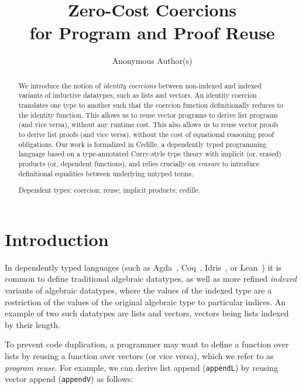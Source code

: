 \documentclass[a4paper,envcountsame,envcountsect]{llncs}
\newcommand{\keywords}[1]{\par\addvspace\baselineskip
\noindent\keywordname\enspace\ignorespaces#1}
\newcommand{\labsec}[1]{\label{sec:#1}}
\begin{document}

\mainmatter
\title{Zero-Cost Coercions \\for Program and Proof Reuse}
\author{Anonymous Author(s)}
\maketitle

\begin{abstract}
  We introduce the notion of \textit{identity coercions} between
  non-indexed and indexed variants of inductive datatypes, such as lists and
  vectors. An identity coercion translates one type to another such that
  the coercion function definitionally reduces to the identity
  function. This allows us to reuse vector programs to derive list
  programs (and vice versa), without any runtime cost. This also
  allows us to reuse vector proofs to derive list proofs (and vice
  versa), without the cost of equational reasoning proof obligations.
  Our work is formalized in Cedille, a dependently typed programming
  language based on a type-annotated Curry-style type theory with
  implicit (or, erased) products (or, dependent functions), and relies
  crucially on \textit{erasure} to introduce definitional
  equalities between underlying untyped terms.

\keywords{
Dependent types; coercion; reuse; implicit products; cedille.
}

\end{abstract}

\section{Introduction}
\labsec{intro}

In dependently typed languages
(such as Agda~\cite{lang:agda}, Coq~\cite{lang:coq},
Idris~\cite{lang:idris}, or Lean~\cite{lang:lean})
it is common to define traditional algebraic datatypes,
as well as more refined \textit{indexed} variants
of algebraic datatypes, where the values of the indexed type are a
restriction of the values of the original algebraic type to particular indices.
An example of two such datatypes are lists and vectors, vectors being
lists indexed by their length.

To prevent code duplication, a programmer may want to define a
function over lists by reusing a function over vectors (or vice versa),
which we refer to as \textit{program reuse}.
For example, we can derive list append (\texttt{appendL}) by reusing
vector append (\texttt{appendV}) as follows:
\end{document}
